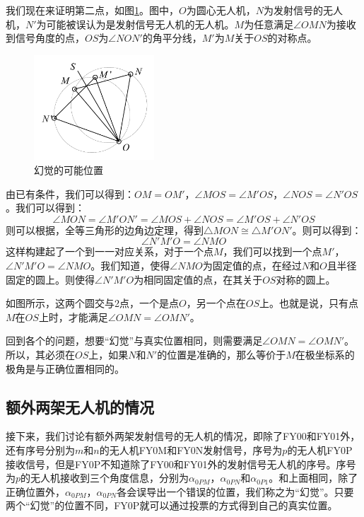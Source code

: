 \documentclass[12pt,AutoFakeSlant,AutoFakeBold]{article}
\begin{document}
我们现在来证明第二点，如图\ref{fig:幻觉重合}。图中，$O$为圆心无人机，$N$为发射信号的无人机，$N'$为可能被误认为是发射信号无人机的无人机。$M$为任意满足$\angle OMN$为接收到信号角度的点，$OS$为$\angle NON'$的角平分线，$M'$为$M$关于$OS$的对称点。

\begin{figure}[!ht]
    \centering
    \includegraphics[width = 0.4\textwidth]{图片/幻觉重合.pdf}
    \caption{幻觉的可能位置}
    \label{fig:幻觉重合}
\end{figure}

由已有条件，我们可以得到：$OM=OM'$，$\angle MOS = \angle M'OS$，$\angle NOS = \angle N'OS$。我们可以得到：
\begin{equation}
    \angle MON = \angle M'ON' = \angle MOS + \angle NOS = \angle M'OS + \angle N'OS
\end{equation}
则可以根据，全等三角形的边角边定理，得到$\bigtriangleup MON \cong \bigtriangleup M'ON'$。则可以得到：
\begin{equation}
    \angle N'M'O = \angle NMO
\end{equation}
这样构建起了一个到一一对应关系，对于一个点$M$，我们可以找到一个点$M'$，$\angle N'M'O = \angle NMO$。我们知道，使得$\angle NMO$为固定值的点，在经过$N$和$O$且半径固定的圆上。则使得$\angle N'M'O$为相同固定值的点，在其关于$OS$对称的圆上。

如图所示，这两个圆交与2点，一个是点$O$，另一个点在$OS$上。也就是说，只有点$M$在$OS$上时，才能满足$\angle OMN = \angle OMN'$。

回到各个的问题，想要“幻觉”与真实位置相同，则需要满足$\angle OMN = \angle OMN'$。所以，其必须在$OS$上，如果$N$和$N'$的位置是准确的，那么等价于$M$在极坐标系的极角是与正确位置相同的。

\subsection{额外两架无人机的情况}

接下来，我们讨论有额外两架发射信号的无人机的情况，即除了FY00和FY01外，还有序号分别为$m$和$n$的无人机FY0M和FY0N发射信号，序号为$p$的无人机FY0P接收信号，但是FY0P不知道除了FY00和FY01外的发射信号无人机的序号。序号为$p$的无人机接收到三个角度信息，分别为$\alpha_{0PM}$，$\alpha_{0PN}$和$\alpha_{0P1}$。和上面相同，除了正确位置外，$\alpha_{0PM}$，$\alpha_{0PN}$各会误导出一个错误的位置，我们称之为“幻觉”。只要两个“幻觉”的位置不同，FY0P就可以通过投票的方式得到自己的真实位置。
\end{document}
